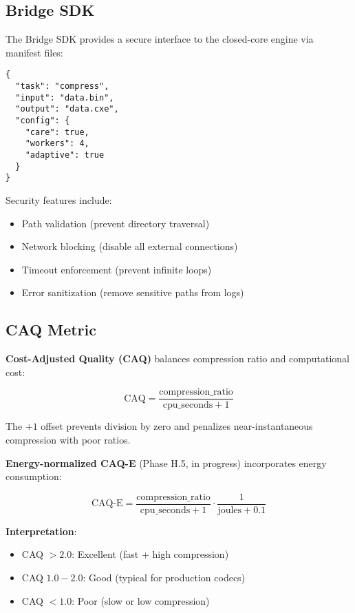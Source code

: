 \documentclass[11pt,twocolumn]{article}
\begin{document}
\subsection{Bridge SDK}

The Bridge SDK provides a secure interface to the closed-core engine via manifest files:

\begin{verbatim}
{
  "task": "compress",
  "input": "data.bin",
  "output": "data.cxe",
  "config": {
    "care": true,
    "workers": 4,
    "adaptive": true
  }
}
\end{verbatim}

Security features include:
\begin{itemize}
    \item Path validation (prevent directory traversal)
    \item Network blocking (disable all external connections)
    \item Timeout enforcement (prevent infinite loops)
    \item Error sanitization (remove sensitive paths from logs)
\end{itemize}

\subsection{CAQ Metric}

\textbf{Cost-Adjusted Quality (CAQ)} balances compression ratio and computational cost:

\begin{equation}
\text{CAQ} = \frac{\text{compression\_ratio}}{\text{cpu\_seconds} + 1}
\end{equation}

The $+1$ offset prevents division by zero and penalizes near-instantaneous compression with poor ratios.

\textbf{Energy-normalized CAQ-E} (Phase H.5, in progress) incorporates energy consumption:

\begin{equation}
\text{CAQ-E} = \frac{\text{compression\_ratio}}{\text{cpu\_seconds} + 1} \cdot \frac{1}{\text{joules} + 0.1}
\end{equation}

\textbf{Interpretation}:
\begin{itemize}
    \item CAQ $> 2.0$: Excellent (fast + high compression)
    \item CAQ $1.0 - 2.0$: Good (typical for production codecs)
    \item CAQ $< 1.0$: Poor (slow or low compression)
\end{itemize}
\end{document}
